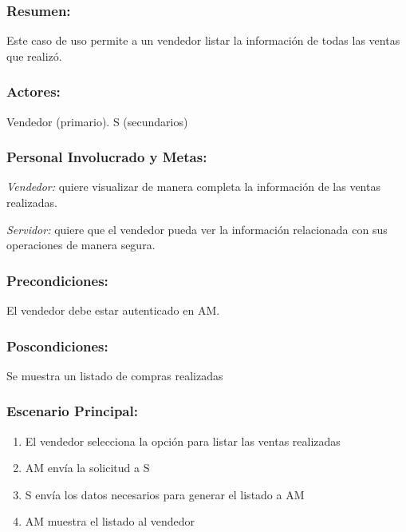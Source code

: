 \begin{framed}


\subsubsection{Resumen:} Este caso de uso permite a un vendedor listar la información de todas las ventas que realizó.


\subsubsection{Actores:} Vendedor (primario). S (secundarios)

\subsubsection{Personal Involucrado y Metas:}

\emph{Vendedor:} quiere visualizar de manera completa la información de las ventas realizadas.

\emph{Servidor:} quiere que el vendedor pueda ver la información relacionada con sus operaciones de manera segura.


\subsubsection{Precondiciones:} 
El vendedor debe estar autenticado en AM.

\subsubsection{Poscondiciones:} 
Se muestra un listado de compras realizadas

\subsubsection{Escenario Principal: }

\begin{enumerate}
    \item El vendedor selecciona la opción para listar las ventas realizadas  
    \item AM envía la solicitud a S
    \item S envía los datos necesarios para generar el listado a AM
    \item AM muestra el listado al vendedor
    
\end{enumerate}


\end{framed}
